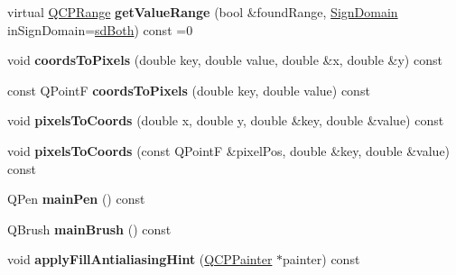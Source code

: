 \begin{DoxyCompactItemize}
\item 
\hypertarget{classQCPAbstractPlottable_aa3331b415b5939fe4df60b78831b2799}{}virtual \hyperlink{classQCPRange}{Q\+C\+P\+Range} {\bfseries get\+Value\+Range} (bool \&found\+Range, \hyperlink{classQCPAbstractPlottable_a661743478a1d3c09d28ec2711d7653d8}{Sign\+Domain} in\+Sign\+Domain=\hyperlink{classQCPAbstractPlottable_a661743478a1d3c09d28ec2711d7653d8a082b98cfb91a7363a3b5cd17b0c1cd60}{sd\+Both}) const =0\label{classQCPAbstractPlottable_aa3331b415b5939fe4df60b78831b2799}

\item 
\hypertarget{classQCPAbstractPlottable_ade710a776104b14c1c835168ce1bfc5c}{}void {\bfseries coords\+To\+Pixels} (double key, double value, double \&x, double \&y) const \label{classQCPAbstractPlottable_ade710a776104b14c1c835168ce1bfc5c}

\item 
\hypertarget{classQCPAbstractPlottable_a9fd1c9df8391781f05b0be22fbe91e13}{}const Q\+Point\+F {\bfseries coords\+To\+Pixels} (double key, double value) const \label{classQCPAbstractPlottable_a9fd1c9df8391781f05b0be22fbe91e13}

\item 
\hypertarget{classQCPAbstractPlottable_a10408828446e9e0681c46d65120f382e}{}void {\bfseries pixels\+To\+Coords} (double x, double y, double \&key, double \&value) const \label{classQCPAbstractPlottable_a10408828446e9e0681c46d65120f382e}

\item 
\hypertarget{classQCPAbstractPlottable_a3e2c361cfcdfd5d803ada4d333a07e15}{}void {\bfseries pixels\+To\+Coords} (const Q\+Point\+F \&pixel\+Pos, double \&key, double \&value) const \label{classQCPAbstractPlottable_a3e2c361cfcdfd5d803ada4d333a07e15}

\item 
\hypertarget{classQCPAbstractPlottable_a19276ed2382a3a06464417b8788b1451}{}Q\+Pen {\bfseries main\+Pen} () const \label{classQCPAbstractPlottable_a19276ed2382a3a06464417b8788b1451}

\item 
\hypertarget{classQCPAbstractPlottable_ae74c123832da180c17e22203e748d9b7}{}Q\+Brush {\bfseries main\+Brush} () const \label{classQCPAbstractPlottable_ae74c123832da180c17e22203e748d9b7}

\item 
\hypertarget{classQCPAbstractPlottable_ac08a480155895e674dbfe5a5670e0ff3}{}void {\bfseries apply\+Fill\+Antialiasing\+Hint} (\hyperlink{classQCPPainter}{Q\+C\+P\+Painter} $\ast$painter) const \label{classQCPAbstractPlottable_ac08a480155895e674dbfe5a5670e0ff3}


\end{DoxyCompactItemize}
